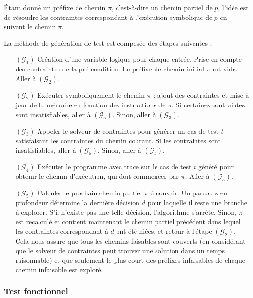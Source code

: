 Étant donné un préfixe de chemin $\pi$, c'est-à-dire un chemin partiel de $p$,
l'idée est de résoudre les contraintes correspondant à l'exécution symbolique
de $p$ en suivant le chemin $\pi$.
 
La méthode de génération de test est composée des étapes suivantes :

\begin{itemize}
\item[$(\mathcal{G}_1)$]
Création d'une variable logique pour chaque entrée.
Prise en compte des contraintes de la pré-condition.
Le préfixe de chemin initial $\pi$ est vide.
Aller à $(\mathcal{G}_2)$.

\item[$(\mathcal{G}_2)$]
Exécuter symboliquement le chemin $\pi$ : ajout des contraintes et
mise à jour de la mémoire en fonction des instructions de $\pi$.
Si certaines contraintes sont insatisfiables, aller à $(\mathcal{G}_5)$.
Sinon, aller à $(\mathcal{G}_3)$.

\item[$(\mathcal{G}_3)$]
Appeler le solveur de contraintes pour générer un cas de test $t$ satisfaisant
les contraintes du chemin courant. Si les contraintes sont insatisfiables, aller
à $(\mathcal{G}_5)$.
Sinon, aller à $(\mathcal{G}_4)$.

\item[$(\mathcal{G}_4)$]
Exécuter le programme avec trace sur le cas de test $t$ généré pour obtenir
le chemin d'exécution, qui doit commencer par $\pi$.
Aller à $(\mathcal{G}_5)$.

\item[$(\mathcal{G}_5)$]
Calculer le prochain chemin partiel $\pi$ à couvrir. Un parcours en profondeur
détermine la dernière décision $d$ pour laquelle il reste une branche à
explorer. S'il n'existe pas une telle décision, l'algorithme s'arrête. Sinon,
$\pi$ est recalculé et contient maintenant le chemin partiel précédent dans
lequel les contraintes correspondant à $d$ ont été niées, et retour à l'étape
$(\mathcal{G}_2)$. Cela nous assure que tous les chemins faisables sont couverts
(en considérant que le solveur de contraintes peut trouver une solution dans un
temps raisonnable) et que seulement le plus court des préfixes infaisables de
chaque chemin infaisable est exploré.
\end{itemize}


\subsubsection*{Test fonctionnel}
\label{sec:test-fonctionnel}


